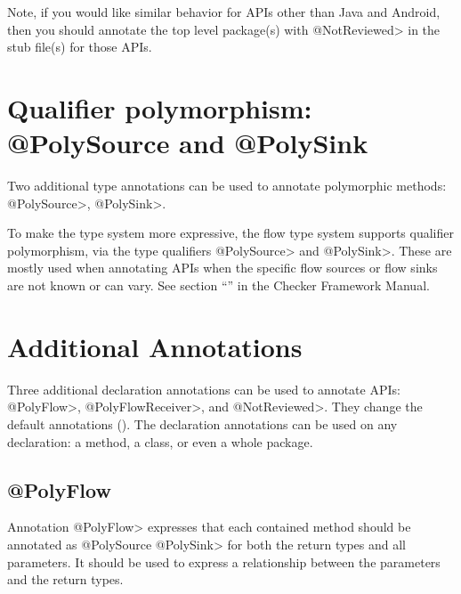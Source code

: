 Note, if you would like similar behavior for APIs other than Java and Android, then you should annotate the top level package(s) with \<@NotReviewed>  in the stub file(s) for those APIs.


\section{Qualifier polymorphism: @PolySource  and @PolySink \label{sec:polyflowsources}}

Two additional type annotations can be used to annotate polymorphic
methods: \<@PolySource>, \<@PolySink>.

To make the type system more expressive, the flow type system supports
qualifier polymorphism, via the type qualifiers \<@PolySource> and
\<@PolySink>.  These are mostly used when annotating APIs when the
specific flow sources or flow sinks are not known or can vary. 
See section ``'' in the Checker Framework Manual.  




\section{Additional Annotations\label{sec:addtionalanno}}

Three additional declaration annotations can be used to annotate APIs:
\<@PolyFlow>,  \<@PolyFlowReceiver>, and \<@NotReviewed>. 
They change the default annotations (). The declaration annotations can 
be used on any declaration: a method, a class, or even a whole package.

\subsection{@PolyFlow\label{sec:polyflow}}

Annotation \<@PolyFlow> expresses that each contained method should be
annotated as \<@PolySource @PolySink> for both the return
types and all parameters.  It should be used to express a relationship between the parameters 
and the return types.

